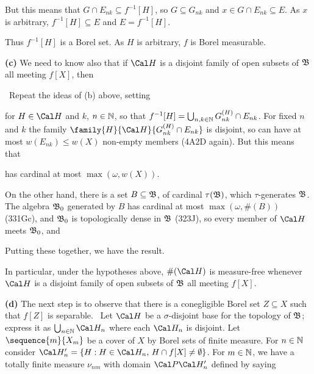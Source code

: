 {\noindent But this means that $G\cap E_{nk}\subseteq f^{-1}[H]$, so
$G\subseteq G_{nk}$ and $x\in G\cap E_{nk}\subseteq E$.   As $x$ is
arbitrary, $f^{-1}[H]\subseteq E$ and $E=f^{-1}[H]$.

\medskip

 Thus $f^{-1}[H]$ is a Borel set.   As $H$ is arbitrary,
$f$ is Borel measurable.\ \Qed

\medskip

{\bf (c)} We need to know also that if
$\Cal H$ is a disjoint family of open subsets of $\frak B$ all meeting
$f[X]$, then


\noindent\Prf\ Repeat the ideas of (b) above, setting


\noindent for $H\in\Cal H$ and $k$, $n\in\Bbb N$, so that
$f^{-1}[H]=\bigcup_{n,k\in\Bbb N}G^{(H)}_{nk}\cap E_{nk}$.   For fixed
$n$ and $k$ the family $\family{H}{\Cal H}{G^{(H)}_{nk}\cap E_{nk}}$ is
disjoint, so can have at most $w(E_{nk})\le w(X)$ non-empty members
(4A2D again).   But this means that


\noindent has cardinal at most $\max(\omega,w(X))$.

On the other hand, there is a set $B\subseteq\frak B$, of cardinal
$\tau(\frak B)$, which $\tau$-generates $\frak B$.   The algebra
$\frak B_0$ generated by $B$ has cardinal at most $\max(\omega,\#(B))$
(331Gc), and $\frak B_0$ is topologically dense in $\frak B$ (323J), so
every member of $\Cal H$ meets $\frak B_0$, and


\noindent Putting these together, we have the result.\ \Qed

In particular, under the hypotheses above, $\#(\Cal H)$ is measure-free
whenever $\Cal H$ is a disjoint family of open subsets of $\frak B$
all meeting $f[X]$.

\medskip

{\bf (d)} The next step is to observe that there is a conegligible Borel
set $Z\subseteq X$ such that $f[Z]$ is separable.   \Prf\ Let $\Cal H$
be a $\sigma$-disjoint base for the topology of $\frak B$;
express it as $\bigcup_{n\in\Bbb N}\Cal H_n$ where each $\Cal H_n$ is
disjoint.   Let $\sequence{m}{X_m}$ be a cover of $X$ by Borel sets of
finite measure.   For $n\in\Bbb N$ consider
$\Cal H'_n=\{H:H\in\Cal H_n,\,H\cap f[X]\ne\emptyset\}$.   For
$m\in\Bbb N$, we have a totally
finite measure $\nu_{nm}$ with domain $\Cal P\Cal H'_n$ defined by
saying

}
